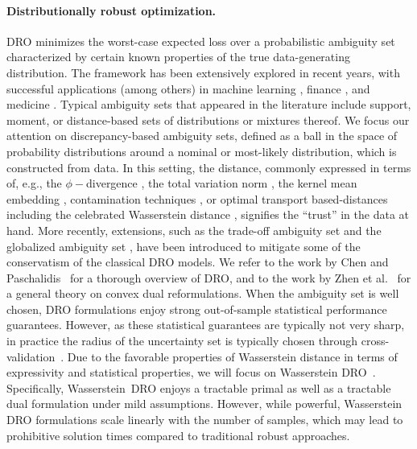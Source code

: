 \paragraph{Distributionally robust optimization.}
\Gls{DRO} minimizes the worst-case expected loss over a probabilistic ambiguity set characterized by certain known properties of the true data-generating distribution.
The framework has been extensively explored in recent years, with successful applications (among others) in machine learning \cite{shafieezadeh2015distributionally}, finance \cite{blanchet2022distributionally}, and medicine \cite{tsang2024stochastic}.  
Typical ambiguity sets that appeared in the literature include support, moment, or distance-based sets of distributions or mixtures thereof. 
We focus our attention on discrepancy-based ambiguity sets, defined as a ball in the space of probability distributions around a nominal or most-likely distribution, which is constructed from data. In this setting, the distance, commonly expressed in terms of, e.g., the $\phi-$divergence \cite{bayraksan2015data}, the total variation norm \cite{tzortzis2015dynamic}, the kernel mean embedding \cite{hannah2010nonparametric}, contamination techniques \cite{kopa2023robustness},  or optimal transport based-distances including
the celebrated Wasserstein distance \cite{mohajerin2018data,kannan2024residuals}, signifies the “trust” in the data at hand. More recently, extensions, such as the trade-off ambiguity set \cite{tsang2024trade} and the globalized ambiguity set \cite{li2024globalized}, have been introduced to mitigate some of the conservatism of the classical DRO models.
We refer to the work by Chen and Paschalidis~\citep{OPT-026} for a thorough overview of \gls{DRO}, and to the work by Zhen et al.~\citep{zhen2021mathematical} for a general theory on convex dual reformulations.
When the ambiguity set is well chosen, \gls{DRO} formulations enjoy strong out-of-sample statistical performance guarantees.
However, as these statistical guarantees are typically not very sharp, in practice the radius of the uncertainty set is typically chosen through cross-validation~\citep{DBLP:gao2020}.
Due to the favorable properties of Wasserstein distance in terms of expressivity and statistical properties, we will focus on Wasserstein DRO~\citep{mohajerin_esfahani_data-driven_2018,kuhn2019wasserstein,DBLP:gao2020,gao2016distributionally}. Specifically, Wasserstein~\gls{DRO} enjoys a tractable primal as well as a tractable dual formulation under mild assumptions.
However, while powerful, Wasserstein \gls{DRO} formulations scale linearly with the number of samples, which may lead to prohibitive solution times compared to traditional robust approaches.


